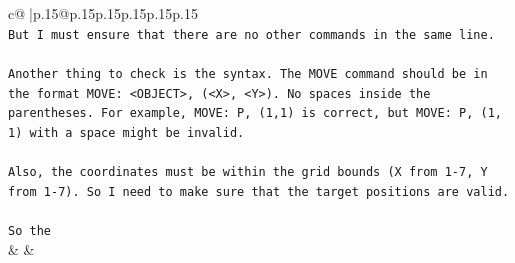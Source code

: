 \documentclass{article}
\begin{document}
{\begin{supertabular}{c@{$\;$}|p{.15\linewidth}@{}p{.15\linewidth}p{.15\linewidth}p{.15\linewidth}p{.15\linewidth}p{.15\linewidth}}
{{{\\ 
\texttt{But I must ensure that there are no other commands in the same line.} \\
\\ 
\texttt{Another thing to check is the syntax. The MOVE command should be in the format MOVE: <OBJECT>, (<X>, <Y>). No spaces inside the parentheses. For example, MOVE: P, (1,1) is correct, but MOVE: P, (1, 1) with a space might be invalid.} \\
\\ 
\texttt{Also, the coordinates must be within the grid bounds (X from 1{-}7, Y from 1{-}7). So I need to make sure that the target positions are valid.} \\
\\ 
\texttt{So the} \\
            }
        }
    }
    & & \\ \\


\end{supertabular}}
\end{document}
